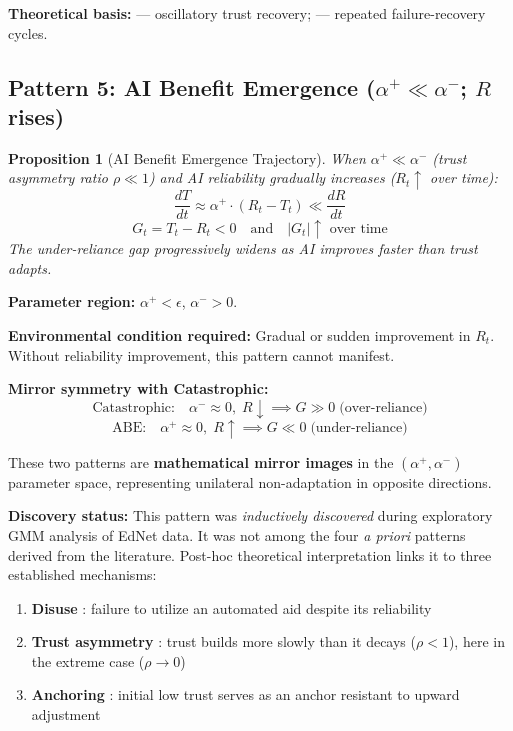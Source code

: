 \documentclass[12pt]{article}
\newtheorem{proposition}{Proposition}
\begin{document}
\textbf{Theoretical basis:}
\citet{gao2006extending} --- oscillatory trust recovery;
\citet{muir1996trust} --- repeated failure-recovery cycles.


\subsection{Pattern 5: AI Benefit Emergence ($\alpha^+ \ll \alpha^-$; $R$ rises)}

\begin{proposition}[AI Benefit Emergence Trajectory]
  When $\alpha^+ \ll \alpha^-$ (trust asymmetry ratio $\rho \ll 1$)
  and AI reliability gradually increases ($R_t \uparrow$ over time):
  \begin{equation}
    \frac{dT}{dt} \approx \alpha^+ \cdot (R_t - T_t) \ll \frac{dR}{dt}
  \end{equation}
  \begin{equation}
    G_t = T_t - R_t < 0 \quad \text{and} \quad |G_t| \uparrow
    \text{ over time}
  \end{equation}
  The under-reliance gap progressively widens as AI improves
  faster than trust adapts.
\end{proposition}

\textbf{Parameter region:} $\alpha^+ < \epsilon$, $\alpha^- > 0$.

\textbf{Environmental condition required:}
Gradual or sudden improvement in $R_t$.
Without reliability improvement, this pattern cannot manifest.

\textbf{Mirror symmetry with Catastrophic:}
\begin{equation}
  \text{Catastrophic:} \quad \alpha^- \approx 0, \; R \downarrow
    \implies G \gg 0 \; \text{(over-reliance)}
\end{equation}
\begin{equation}
  \text{ABE:} \quad \alpha^+ \approx 0, \; R \uparrow
    \implies G \ll 0 \; \text{(under-reliance)}
\end{equation}

These two patterns are \textbf{mathematical mirror images} in the
$(\alpha^+, \alpha^-)$ parameter space, representing unilateral
non-adaptation in opposite directions.

\textbf{Discovery status:}
This pattern was \textit{inductively discovered} during exploratory
GMM analysis of EdNet data. It was not among the four
\textit{a priori} patterns derived from the literature.
Post-hoc theoretical interpretation links it to three established
mechanisms:
\begin{enumerate}
  \item \textbf{Disuse} \citep{parasuraman1997humans}:
    failure to utilize an automated aid despite its reliability
  \item \textbf{Trust asymmetry} \citep{lee1992trust}:
    trust builds more slowly than it decays ($\rho < 1$),
    here in the extreme case ($\rho \to 0$)
  \item \textbf{Anchoring} \citep{tversky1974judgment}:
    initial low trust serves as an anchor resistant to
    upward adjustment
\end{enumerate}
\end{document}
